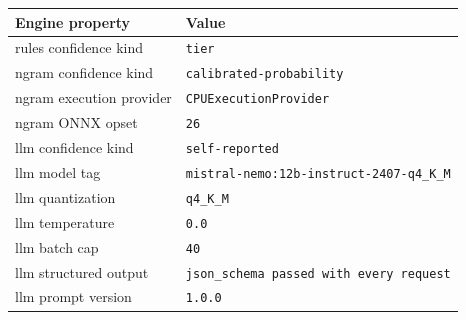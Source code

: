 \begingroup\small\setlength{\tabcolsep}{4pt}
\begin{tabular}{ll}
\toprule
\textbf{Engine property} & \textbf{Value} \\
\midrule
rules confidence kind & \texttt{tier} \\
ngram confidence kind & \texttt{calibrated-probability} \\
ngram execution provider & \texttt{CPUExecutionProvider} \\
ngram ONNX opset & \texttt{26} \\  %
llm confidence kind & \texttt{self-reported} \\
llm model tag & \texttt{mistral-nemo:12b-instruct-2407-q4\_K\_M} \\  %
llm quantization & \texttt{q4\_K\_M} \\  %
llm temperature & \texttt{0.0} \\  %
llm batch cap & \texttt{40} \\  %
llm structured output & \texttt{json\_schema passed with every request} \\
llm prompt version & \texttt{1.0.0} \\  %
\bottomrule
\end{tabular}
\endgroup
\par\smallskip{}
